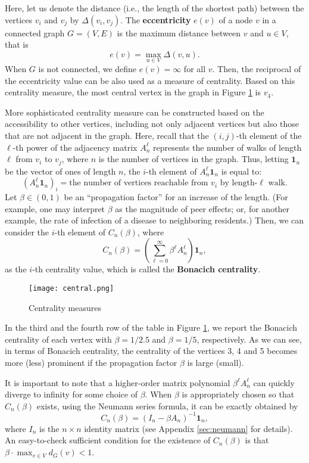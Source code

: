 \documentclass[11pt, A4paper, openany, uplatex]{book}
\begin{document}
\begin{appendices}
Here, let us denote the distance (i.e., the length of the shortest path) between the vertices $v_i$ and $v_j$ by $\Delta(v_i, v_j)$.
The \textbf{eccentricity} $e(v)$ of a node $v$ in a connected graph $G = (V, E)$ is the maximum distance between $v$ and $u \in V$, that is
\[
	e(v) = \max_{u \in V} \Delta(v, u).
\]
When $G$ is not connected, we define $e(v) = \infty$ for all $v$.
Then, the reciprocal of the eccentricity value can be also used as a measure of centrality.
Based on this centrality measure, the most central vertex in the graph in Figure \ref{fig:center} is $v_4$.

More sophisticated centrality measure can be constructed based on the accessibility to other vertices, including not only adjacent vertices but also those that are not adjacent in the graph. 
Here, recall that the $(i,j)$-th element of the $\ell$-th power of the adjacency matrix $A_n^\ell$ represents the number of walks of length $\ell$ from $v_i$ to $v_j$, where $n$ is the number of vertices in the graph.
Thus, letting $\mathbf{1}_n$ be the vector of ones of length $n$, the $i$-th element of $A_n^\ell \mathbf{1}_n$ is equal to:
\[
	(A_n^\ell \mathbf{1}_n)_i = \text{the number of vertices reachable from $v_i$ by length-$\ell$ walk.}
\]
Let $\beta \in (0,1)$ be an ``propagation factor'' for an increase of the length.
(For example, one may interpret $\beta$ as the magnitude of peer effects; or, for another example, the rate of infection of a disease to neighboring residents.)
Then, we can consider the $i$-th element of $C_n(\beta)$, where
\[
	C_n(\beta) = \left( \sum_{\ell = 0}^\infty \beta^\ell A_n^\ell \right) \mathbf{1}_n,
\]
as the $i$-th centrality value, which is called the \textbf{Bonacich centrality}.

\begin{figure}[h!]
	\begin{center}
		\texttt{[image: central.png]}
		\caption{Centrality measures\label{fig:center}}
	\end{center}
\end{figure}

In the third and the fourth row of the table in Figure \ref{fig:center}, we report the Bonacich centrality of each vertex with $\beta = 1/2.5$ and $\beta = 1/5$, respectively.
As we can see, in terms of Bonacich centrality, the centrality of the vertices 3, 4 and 5 becomes more (less) prominent if the propagation factor $\beta$ is large (small).

It is important to note that a higher-order matrix polynomial $\beta^\ell A_n^\ell$ can quickly diverge to infinity for some choice of $\beta$.
When $\beta$ is appropriately chosen so that $C_n(\beta)$ exists, using the Neumann series formula, it can be exactly obtained by
\[
C_n(\beta) = \left(I_n - \beta A_n \right)^{-1}\mathbf{1}_n,
\]
where $I_n$ is the $n \times n$ identity matrix (see Appendix \ref{sec:neumann} for details).
An easy-to-check sufficient condition for the existence of $C_n(\beta)$ is that $\beta \cdot \max_{v \in V}d_G(v) < 1$.


\end{appendices}
\end{document}
